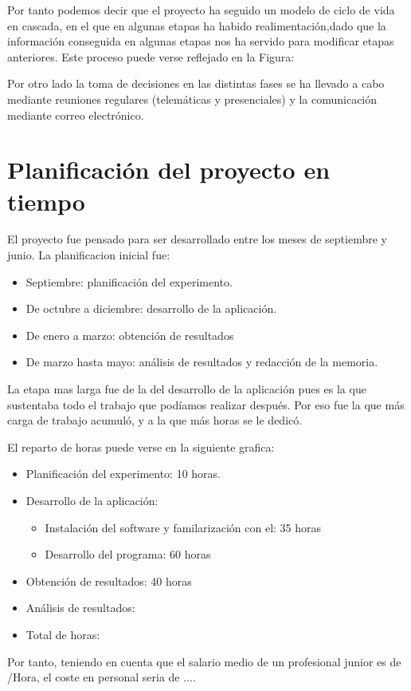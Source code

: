 \documentclass[a4paper,11pt, oneside]{book}
\begin{document}
Por tanto podemos decir que el proyecto ha seguido un modelo de ciclo de vida en cascada, en el que en algunas etapas ha habido realimentación,dado que la información conseguida en algunas etapas nos ha servido para modificar etapas anteriores. Este proceso puede verse reflejado en la Figura:

Por otro lado la toma de decisiones en las distintas fases se ha llevado a cabo mediante reuniones regulares (telemáticas y presenciales) y la comunicación mediante correo electrónico.

\section{Planificación del proyecto en tiempo}
El proyecto fue pensado para ser desarrollado entre los meses de septiembre y junio. La planificacion inicial fue:
\begin{itemize}
	\item Septiembre: planificación del experimento.
	\item De octubre a diciembre: desarrollo de la aplicación.
	\item De enero a marzo: obtención de resultados
	\item De marzo hasta mayo: análisis de resultados y redacción de la memoria.
\end{itemize}
La etapa mas larga fue de la del desarrollo de la aplicación pues es la que sustentaba todo el trabajo que podíamos realizar después. Por eso fue la que más carga de trabajo acumuló, y a la que más horas se le dedicó.

El reparto de horas puede verse en la siguiente grafica:
\begin{itemize}
	\item Planificación del experimento: 10 horas. 
	\item Desarrollo de la aplicación:
		\begin{itemize}
			\item Instalación del software y familarización con el: 35 horas
			\item Desarrollo del programa: 60 horas
		\end{itemize}
	\item Obtención de resultados: 40 horas
	\item Análisis de resultados:
	\item Total de horas: 
\end{itemize}
Por tanto, teniendo en cuenta que el salario medio de un profesional junior es de /Hora, el coste en personal seria de ....
\end{document}
